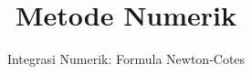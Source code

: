 



\title{Metode Numerik}
\subtitle{Integrasi Numerik: Formula Newton-Cotes}
\date{}


\frame{\titlepage}
















